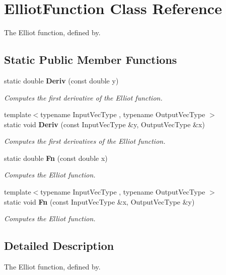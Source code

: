 \section{Elliot\+Function Class Reference}
\label{classmlpack_1_1ann_1_1ElliotFunction}


The Elliot function, defined by.  


\subsection*{Static Public Member Functions}
\begin{DoxyCompactItemize}
\item 
static double \textbf{ Deriv} (const double y)
\begin{DoxyCompactList}\small\item\em Computes the first derivative of the Elliot function. \end{DoxyCompactList}\item 
{\footnotesize template$<$typename Input\+Vec\+Type , typename Output\+Vec\+Type $>$ }\\static void \textbf{ Deriv} (const Input\+Vec\+Type \&y, Output\+Vec\+Type \&x)
\begin{DoxyCompactList}\small\item\em Computes the first derivatives of the Elliot function. \end{DoxyCompactList}\item 
static double \textbf{ Fn} (const double x)
\begin{DoxyCompactList}\small\item\em Computes the Elliot function. \end{DoxyCompactList}\item 
{\footnotesize template$<$typename Input\+Vec\+Type , typename Output\+Vec\+Type $>$ }\\static void \textbf{ Fn} (const Input\+Vec\+Type \&x, Output\+Vec\+Type \&y)
\begin{DoxyCompactList}\small\item\em Computes the Elliot function. \end{DoxyCompactList}\end{DoxyCompactItemize}


\subsection{Detailed Description}
The Elliot function, defined by. 


